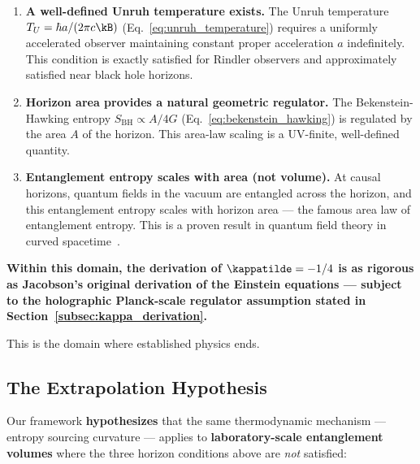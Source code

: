 \begin{enumerate}
    \item \textbf{A well-defined Unruh temperature exists.} The Unruh
    temperature $T_U = \hbar a/(2\pi c\kB)$ (Eq.~\eqref{eq:unruh_temperature})
    requires a uniformly accelerated observer maintaining constant proper
    acceleration $a$ indefinitely. This condition is exactly satisfied for
    Rindler observers and approximately satisfied near black hole horizons.

    \item \textbf{Horizon area provides a natural geometric regulator.}
    The Bekenstein-Hawking entropy $S_{\mathrm{BH}} \propto A/4G$
    (Eq.~\eqref{eq:bekenstein_hawking}) is regulated by the area $A$ of
    the horizon. This area-law scaling is a UV-finite, well-defined
    quantity.

    \item \textbf{Entanglement entropy scales with area (not volume).}
    At causal horizons, quantum fields in the vacuum are entangled across
    the horizon, and this entanglement entropy scales with horizon area ---
    the famous area law of entanglement entropy. This is a proven result in
    quantum field theory in curved spacetime~\cite{bombelli1986,srednicki1993}.
\end{enumerate}

\noindent\textbf{Within this domain, the derivation of $\kappatilde = -1/4$
is as rigorous as Jacobson's original derivation of the Einstein equations ---
subject to the holographic Planck-scale regulator assumption stated in
Section~\ref{subsec:kappa_derivation}.}

This is the domain where established physics ends.

\subsection{The Extrapolation Hypothesis}
\label{subsec:hypothesis}

Our framework \textbf{hypothesizes} that the same thermodynamic mechanism ---
entropy sourcing curvature --- applies to \textbf{laboratory-scale entanglement
volumes} where the three horizon conditions above are \emph{not} satisfied:

